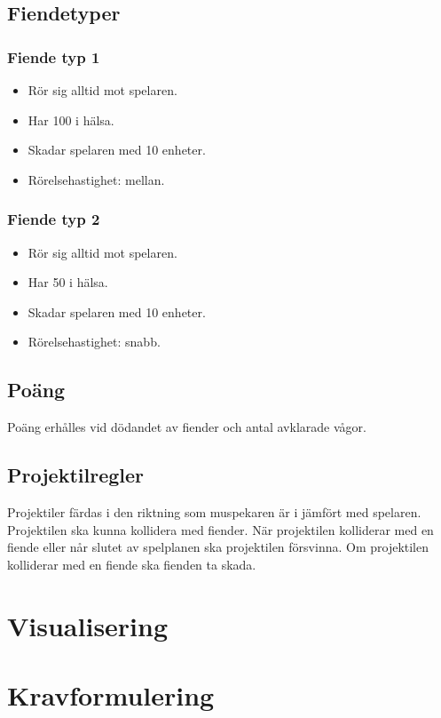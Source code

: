 \documentclass{TDP005mall}
\begin{document}
\subsection{Fiendetyper}

\subsubsection{Fiende typ 1}
\begin{itemize}
\item Rör sig alltid mot spelaren.
\item Har 100 i hälsa.
\item Skadar spelaren med 10 enheter.
\item Rörelsehastighet: mellan.
\end{itemize}

\subsubsection{Fiende typ 2}
\begin{itemize}
\item Rör sig alltid mot spelaren.
\item Har 50 i hälsa.
\item Skadar spelaren med 10 enheter.
\item Rörelsehastighet: snabb.
\end{itemize}

\subsection{Poäng}
Poäng erhålles vid dödandet av fiender och antal avklarade vågor.

\subsection{Projektilregler}
Projektiler färdas i den riktning som muspekaren är i jämfört med spelaren.
Projektilen ska kunna kollidera med fiender.
När projektilen kolliderar med en fiende eller når slutet av spelplanen ska projektilen försvinna.
Om projektilen kolliderar med en fiende ska fienden ta skada.

\section{Visualisering}


\section{Kravformulering}
\end{document}

